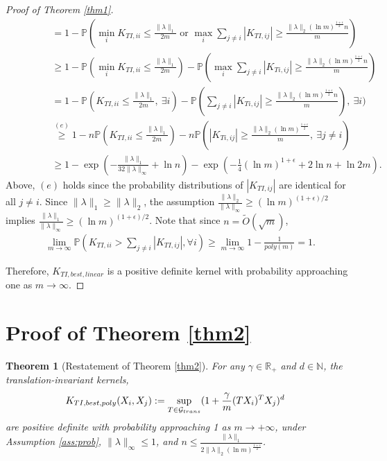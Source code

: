 \documentclass{article}
\theoremstyle{plain}
\newtheorem{theorem}{Theorem}
\theoremstyle{definition}
\theoremstyle{remark}
\begin{document}
\begin{proof}[Proof of Theorem \ref{thm1}]
\begin{align*}
& \  \ \ \ \ \ \ \ \ \ \ \ \ \ \ \ = 1 - \mathbb{P}(\min_i K_{TI, ii} \le \frac{\|\lambda\|_1}{2 m} \text{ or } \max_i \sum_{j \neq i} |K_{TI, ij}| \ge \frac{\|\lambda\|_2 (\ln m)^{\frac{1+\epsilon}{2}}n}{m})\\
& \  \ \ \ \ \ \ \ \ \ \ \ \ \ \ \ \ge 1 - \mathbb{P}(\min_i K_{TI,ii} \le \frac{\|\lambda\|_1}{2 m}) - \mathbb{P}(\max_i \sum_{j \neq i}|K_{Ti, ij}| \ge \frac{\|\lambda\|_2 (\ln m)^{\frac{1+\epsilon}{2}}n}{m}) \\
& \  \ \ \ \ \ \ \ \ \ \ \ \ \ \ \ = 1 - \mathbb{P}(K_{TI,ii} \le \frac{\|\lambda\|_1}{2 m}, \ \exists i) - \mathbb{P}(\sum_{j \neq i}|K_{Ti, ij}| \ge \frac{\|\lambda\|_2 (\ln m)^{\frac{1+\epsilon}{2}}n}{m}), \ \exists i) \\
& \  \ \ \ \ \ \ \ \ \ \ \ \ \ \ \ \stackrel{(e)}{\ge} 1 - n \mathbb{P}(K_{TI,ii} \le \frac{\|\lambda\|_1}{2 m}) - n \mathbb{P}(|K_{Ti, ij}| \ge \frac{\|\lambda\|_2 (\ln m)^{\frac{1+\epsilon}{2}}}{m}, \ \exists j \neq i)\\
& \  \ \ \ \ \ \ \ \ \ \ \ \ \ \ \ \ge 1 - \exp(-\frac{\|\lambda\|_1}{32\|\lambda\|_{\infty}} + \ln n) - \exp(-\frac{1}{4} (\ln m)^{1+\epsilon} + 2 \ln n + \ln 2m).
\end{align*}
Above, $(e)$ holds since the probability distributions of $|K_{TI, ij}|$ are identical for all $j \neq i$. Since $\|\lambda\|_1 \geq \|\lambda\|_2$, the assumption $\frac{\|\lambda\|_{2}}{\|\lambda\|_\infty} \geq (\ln m)^{(1+\epsilon)/2}$ implies $\frac{\|\lambda\|_1}{\|\lambda\|_\infty} \geq (\ln m)^{(1+\epsilon)/2}$. Note that since $n = \tilde{O}(\sqrt{m})$,
\begin{align*}
    \lim_{m \to \infty} \mathbb{P}(K_{TI, ii} > \sum_{j \neq i} |K_{TI, ij}|, \forall i) \geq \lim_{m \to \infty} 1 - \frac{1}{poly(m)} = 1.
\end{align*}

Therefore, $K_{TI,best,linear}$ is a positive definite kernel with probability approaching one as $m \to \infty$.
\end{proof}



\section{Proof of Theorem \ref{thm2}}
\label{sec:app_thm2}
\begin{theorem}[Restatement of Theorem \ref{thm2}]
    For any $\gamma \in \mathbb{R}_+$ and $ d \in \mathbb{N}$,
    the translation-invariant kernels,
    \begin{align*}
    K_{TI,best,poly}(X_i,X_j) &:= \sup_{T \in {\cal{G}}_{trans}}(1 + \frac{\gamma}{m}   (TX_i)^TX_j)^d
    \end{align*}
    are positive definite with probability approaching 1 as $m \to +\infty$, under Assumption \ref{ass:prob}, $\|\lambda\|_{\infty} \leq 1$, and $n \leq \frac{\|\lambda\|_1}{2\|\lambda\|_2 (\ln m)^{\frac{1+\epsilon}{2}}}$.
\end{theorem}
\end{document}

